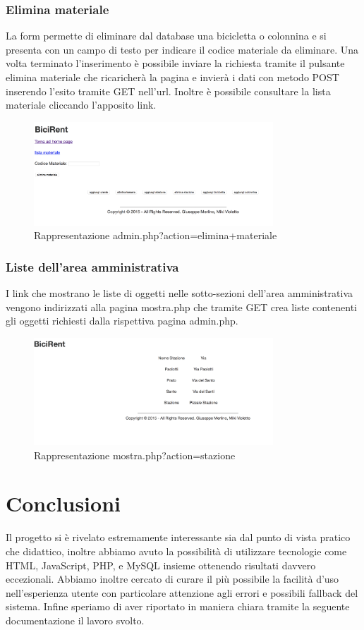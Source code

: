 \documentclass[a4paper,twoside]{article}
\begin{document}
\subsubsection{Elimina materiale}
La form permette di eliminare dal database una bicicletta o colonnina e si presenta con un campo di testo per indicare il codice materiale da eliminare. Una volta terminato l'inserimento è possibile inviare la richiesta tramite il pulsante elimina materiale che ricaricherà la pagina e invierà i dati con metodo POST inserendo l'esito tramite GET nell'url. Inoltre è possibile consultare la lista materiale cliccando l'apposito link.
\begin{figure}[H]
	\centering
	\includegraphics[width=0.8\textwidth]{Screenshot13}
	\caption{Rappresentazione admin.php?action=elimina+materiale}
\end{figure}
\subsubsection{Liste dell'area amministrativa}
I link che mostrano le liste di oggetti nelle sotto-sezioni dell'area amministrativa vengono indirizzati alla pagina mostra.php che tramite GET crea liste contenenti gli oggetti richiesti dalla rispettiva pagina admin.php.
\begin{figure}[H]
	\centering
	\includegraphics[width=0.8\textwidth]{Screenshot14}
	\caption{Rappresentazione mostra.php?action=stazione}
\end{figure}
\section{Conclusioni}
Il progetto si è rivelato estremamente interessante sia dal punto di vista pratico che didattico, inoltre abbiamo avuto la possibilità di utilizzare tecnologie come HTML, JavaScript, PHP, e MySQL insieme ottenendo risultati davvero eccezionali. Abbiamo inoltre cercato di curare il più possibile la facilità d'uso nell'esperienza utente con particolare attenzione agli errori e possibili fallback del sistema. Infine speriamo di aver riportato in maniera chiara tramite la seguente documentazione il lavoro svolto.
\end{document}
